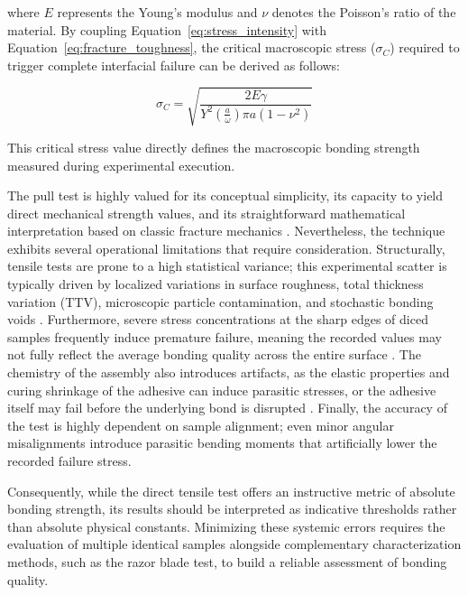 \noindent where $E$ represents the Young's modulus and $\nu$ denotes the Poisson's ratio of 
the material. By coupling Equation~\ref{eq:stress_intensity} with Equation~\ref{eq:fracture_toughness}, 
the critical macroscopic stress ($\sigma_{C}$) required to trigger complete interfacial 
failure can be derived as follows:

\begin{equation}
\sigma_{C}=\sqrt{\frac{2E\gamma}{Y^2\left(\frac{a}{\omega}\right)\pi a(1-\nu^{2})}}
\label{eq:critical_stress}
\end{equation}

This critical stress value directly defines the macroscopic bonding strength measured during 
experimental execution.

The pull test is highly valued for its conceptual simplicity, its capacity to yield direct 
mechanical strength values, and its straightforward mathematical interpretation based on classic 
fracture mechanics \cite{muller1991}. Nevertheless, the technique exhibits several operational 
limitations that require consideration. Structurally, tensile tests are prone to a high statistical 
variance; this experimental scatter is typically driven by localized variations in surface roughness, 
total thickness variation (TTV), microscopic particle contamination, and stochastic bonding 
voids \cite{muller1991,gosele2006}. Furthermore, severe stress concentrations at the sharp edges 
of diced samples frequently induce premature failure, meaning the recorded values may not fully 
reflect the average bonding quality across the entire surface \cite{wasmer2007}. The chemistry of 
the assembly also introduces artifacts, as the elastic properties and curing shrinkage of the adhesive 
can induce parasitic stresses, or the adhesive itself may fail before the underlying bond 
is disrupted \cite{muller1991}. Finally, the accuracy of the test is highly dependent on sample 
alignment; even minor angular misalignments introduce parasitic bending moments that artificially 
lower the recorded failure stress.

Consequently, while the direct tensile test offers an instructive metric of absolute bonding strength, 
its results should be interpreted as indicative thresholds rather than absolute physical constants. 
Minimizing these systemic errors requires the evaluation of multiple identical samples alongside 
complementary characterization methods, such as the razor blade test, to build a reliable assessment 
of bonding quality. 